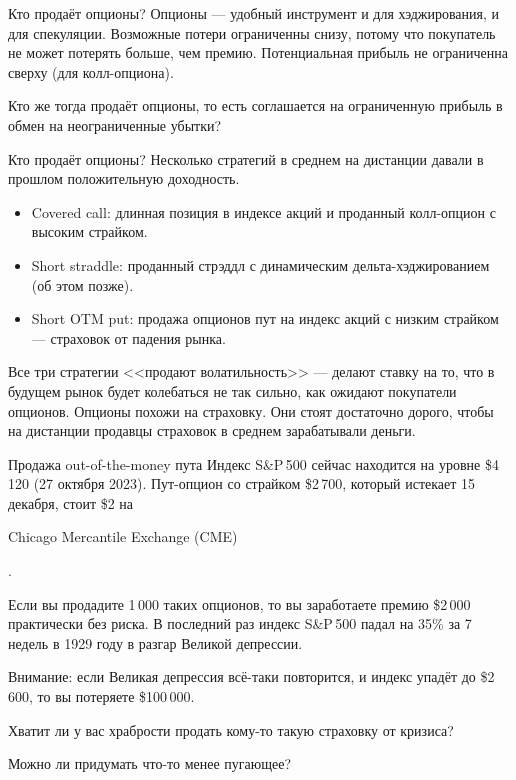 \documentclass{beamer}
\newcommand{\en}[1]{\begin{otherlanguage}{english}#1\end{otherlanguage}}
\begin{document}
\begin{frame}{Кто продаёт опционы?}
\justify
Опционы --- удобный инструмент и для хэджирования, и для спекуляции. Возможные потери 
ограниченны снизу, потому что покупатель не может потерять больше, чем премию. Потенциальная прибыль не ограниченна сверху (для колл-опциона).

\justify
Кто же тогда продаёт опционы, то есть соглашается на ограниченную прибыль в обмен на 
неограниченные убытки?
\end{frame}



\begin{frame}{Кто продаёт опционы?}
\justify
Несколько стратегий в среднем на дистанции давали в прошлом положительную доходность.

\justify
\begin{itemize}
\justifying
\item Covered call: длинная позиция в индексе акций и проданный колл-опцион с высоким страйком.
\item Short straddle: проданный стрэддл с динамическим дельта-хэджированием (об этом позже).
\item Short OTM put: продажа опционов пут на индекс акций с низким страйком --- страховок от падения рынка.
\end{itemize}

\justify
Все три стратегии <<продают волатильность>> --- делают ставку на то, что в будущем рынок будет колебаться не так сильно, как ожидают покупатели опционов. Опционы похожи на страховку. Они стоят достаточно дорого, чтобы на дистанции продавцы страховок в среднем зарабатывали деньги.
\end{frame}



\begin{frame}{Продажа out-of-the-money пута}
\justify
Индекс S\&P\,500 сейчас находится на уровне \$4\,120 (27 октября 2023). Пут-опцион со страйком \$2\,700, который истекает 15 декабря, стоит \$2 на \en{Chicago Mercantile Exchange (CME)}.

\justify
Если вы продадите 1\,000 таких опционов, то вы заработаете премию \$2\,000 практически без риска. В последний раз индекс S\&P\,500 падал на 35\% за 7 недель в 1929 году в разгар Великой депрессии.

\justify
Внимание: если Великая депрессия всё-таки повторится, и индекс упадёт до \$2\,600, то вы потеряете \$100\,000.

\justify
Хватит ли у вас храбрости продать кому-то такую страховку от кризиса?

\justify
Можно ли придумать что-то менее пугающее?
\end{frame}
\end{document}
